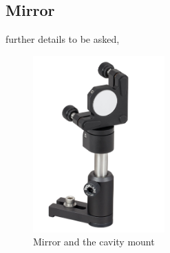 \subsection{Mirror}
further details to be asked, 
\begin{figure}[h!]
\centering
\label{fig:mirror}
 \includegraphics[width=0.45\textwidth]{Figures/mirror.jpg}
 \caption{Mirror and the cavity mount} 
\end{figure}


